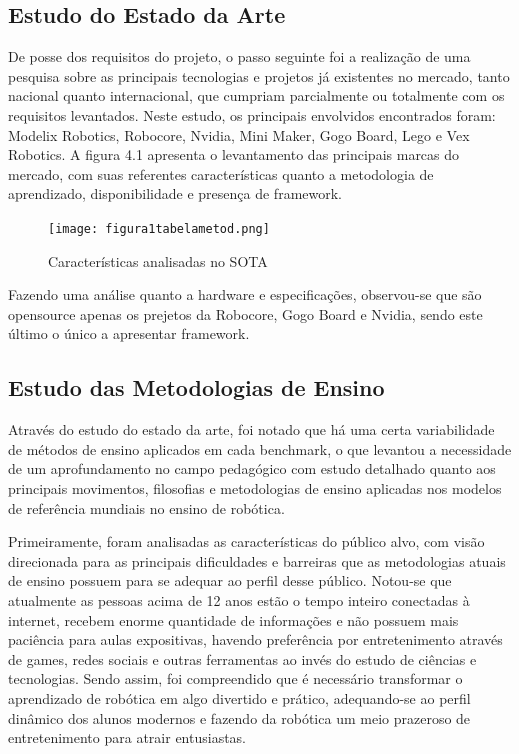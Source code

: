 \subsection{Estudo do Estado da Arte}
De posse dos requisitos do projeto, o passo seguinte foi a realização de uma pesquisa sobre as principais tecnologias e projetos já existentes no mercado, tanto nacional quanto internacional, que cumpriam parcialmente ou totalmente com os requisitos levantados. Neste estudo, os principais envolvidos encontrados foram: Modelix Robotics, Robocore, Nvidia, Mini Maker, Gogo Board, Lego e Vex Robotics.
A figura 4.1 apresenta o levantamento das principais marcas do mercado, com suas referentes características quanto a metodologia de aprendizado, disponibilidade e presença de framework.

\begin{figure}[h!]					
	\centering
	\caption{Características analisadas no SOTA}					
	\texttt{[image: figura1tabelametod.png]}					
	\label{img:sotabru}	
\end{figure}

Fazendo uma análise quanto a hardware e especificações, observou-se que são opensource apenas os prejetos da Robocore, Gogo Board e Nvidia, sendo este último o único a apresentar framework.


\subsection{Estudo das Metodologias de Ensino}
	
Através do estudo do estado da arte, foi notado que há uma certa variabilidade de métodos de ensino aplicados em cada benchmark, o que levantou a necessidade de um aprofundamento no campo pedagógico com estudo detalhado quanto aos principais movimentos, filosofias e metodologias de ensino aplicadas nos modelos de referência mundiais no ensino de robótica. 

Primeiramente, foram analisadas as características do público alvo, com visão direcionada para as principais dificuldades e barreiras que as metodologias atuais de ensino possuem para se adequar ao perfil desse público. Notou-se que atualmente as pessoas acima de 12 anos estão o tempo inteiro conectadas à internet, recebem enorme quantidade de informações e não possuem mais paciência para aulas expositivas, havendo preferência por entretenimento através de games, redes sociais e outras ferramentas ao invés do estudo de ciências e tecnologias. Sendo assim, foi compreendido que é necessário transformar o aprendizado de robótica em algo divertido e prático, adequando-se ao perfil dinâmico dos alunos modernos e fazendo da robótica um meio prazeroso de entretenimento para atrair entusiastas.

